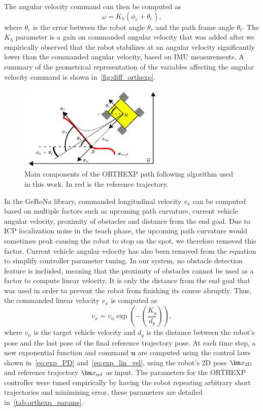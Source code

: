 The angular velocity command can then be computed as %
\begin{equation}
	\label{eq:exp_PD}
	\omega = K_h (\phi_e + \theta_e),
\end{equation}
where $\theta_e$ is the error between the robot angle $\theta_r$ and the path frame angle $\theta_t$.
The $K_h$ parameter is a gain on commanded angular velocity that was added after we empirically observed that the robot stabilizes at an angular velocity significantly lower than the commanded angular velocity, based on \ac{IMU} measurements.
A summary of the geometrical representation of the variables affecting the angular velocity command is shown in~\autoref{fig:diff_orthexp}.

\begin{figure}
	\centering
	\includegraphics[height=1.6in]{figs/path_follower/orthexp.pdf}
	\caption{Main components of the \ac{ORTHEXP} path following algorithm used in this work.
		In red is the reference trajectory.}
	\label{fig:diff_orthexp}
\end{figure}

In the \ac{GeRoNa} library, commanded longitudinal velocity $v_x$ can be computed based on multiple factors such as upcoming path curvature, current vehicle angular velocity, proximity of obstacles and distance from the end goal.
Due to \ac{ICP} localization noise in the teach phase, the upcoming path curvature would sometimes peak causing the robot to stop on the spot, we therefore removed this factor.
Current vehicle angular velocity has also been removed from the equation to simplify controller parameter tuning.
In our system, no obstacle detection feature is included, meaning that the proximity of obstacles cannot be used as a factor to compute linear velocity.
It is only the distance from the end goal that was used in order to prevent the robot from finishing its course abruptly.
Thus, the commanded linear velocity $v_x$ is computed as
\begin{equation}
	\label{eq:exp_lin_vel}
	v_x = v_n \exp\left(-\left(\frac{K_g}{d_g}\right)\right),
\end{equation}
where $v_n$ is the target vehicle velocity and $d_g$ is the distance between the robot's pose and the last pose of the final reference trajectory pose.
At each time step, a new exponential function and command $\bm u$ are computed using the control laws shown in~\autoref{eq:exp_PD} and~\autoref{eq:exp_lin_vel}, using the robot's 2D pose $\poseplane$ and reference trajectory $\reftraj$ as input.
The parameters for the \ac{ORTHEXP} controller were tuned empirically by having the robot repeating arbitrary short trajectories and minimizing error, these parameters are detailed in~\autoref{tab:orthexp_params}.



